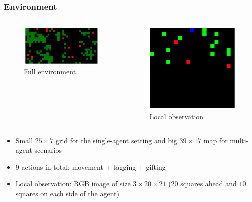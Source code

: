 \documentclass{beamer}
\begin{document}
\begin{frame}
	\frametitle{Environment}
	\center
	\begin{columns}
		\begin{column}{0.6\textwidth}
			\begin{figure}
				\centering
				\includegraphics[width=0.7\linewidth]{../assets/env-example.png}
				\caption*{Full environment}
			\end{figure}
		\end{column}
		\begin{column}{0.4\textwidth}
			\begin{figure}
				\centering
				\includegraphics[width=0.7\linewidth]{../assets/obs-example.png}
				\caption*{Local observation}
			\end{figure}
		\end{column}
	\end{columns}
	\begin{itemize}
		\item Small $25\times 7$ grid for the single-agent setting and big $39\times 17$ map for multi-agent scenarios
		\item $9$ actions in total: movement + tagging + gifting
		\item Local observation: RGB image of size $3\times20\times21$ ($20$ squares ahead and $10$ squares on each side of the agent)
	\end{itemize}
\end{frame}
\end{document}
